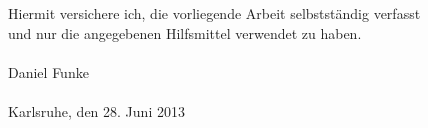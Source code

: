 \mbox{}\\
\vspace{15cm}
\\
Hiermit versichere ich, die vorliegende Arbeit selbstst\"andig verfasst\\
und nur die angegebenen Hilfsmittel verwendet zu haben.\\
\vspace{2cm}\\
Daniel Funke
\\
\\
Karlsruhe, den 28. Juni 2013
